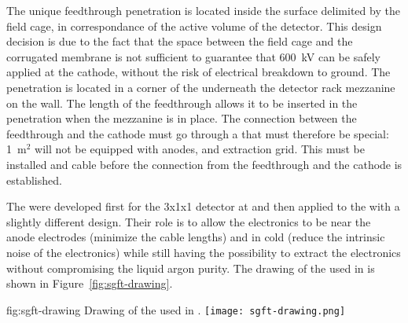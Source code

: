 The unique  feedthrough penetration is located inside the surface delimited by the field cage, in correspondance of the active volume of the detector.
This design decision is due to the fact that the space between the field cage and the corrugated membrane is not sufficient to guarantee that 600~kV can be safely applied at the cathode, without the risk of electrical breakdown to ground.
The penetration is located in a corner of the  underneath the detector rack mezzanine on the  wall.
The length of the feedthrough allows it to be inserted in the penetration when the mezzanine is in place.
The connection between the feedthrough and the cathode must go through a  that must therefore be special: 1~m$^2$ will not be equipped with anodes,  and extraction grid.
This  must be installed and cable before the connection from the  feedthrough and the cathode is established.

The  were developed first for the 3x1x1 detector at  and then applied to the  with a slightly different design.
Their role is to allow the electronics to be near the anode electrodes (minimize the cable lengths) and in cold (reduce the intrinsic noise of the electronics) while still having the possibility to extract the electronics without compromising the liquid argon purity.
The drawing of the  used in  is shown in Figure~\ref{fig:sgft-drawing}.
\begin{dunefigure}{fig:sgft-drawing}
{Drawing of the  used in .}
\texttt{[image: sgft-drawing.png]}
\end{dunefigure}

